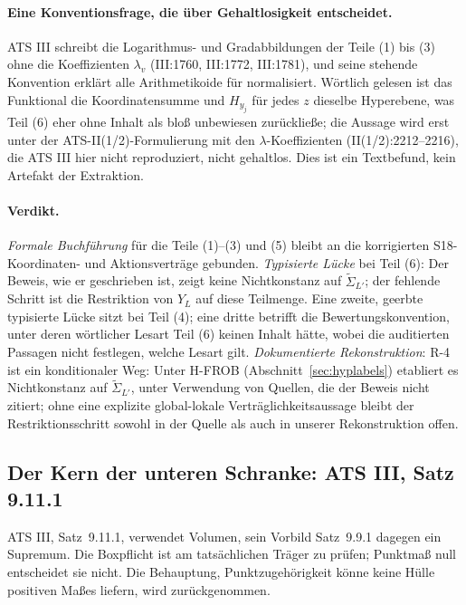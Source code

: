 \documentclass[11pt,a4paper]{article}
\theoremstyle{definition}
\theoremstyle{remark}
\begin{document}
\paragraph{Eine Konventionsfrage, die über Gehaltlosigkeit entscheidet.} ATS
III schreibt die Logarithmus- und Gradabbildungen der Teile (1) bis (3) ohne
die Koeffizienten $\lambda_v$ (III:1760, III:1772, III:1781), und seine
stehende Konvention erklärt alle Arithmetikoide für normalisiert. Wörtlich
gelesen ist das Funktional die Koordinatensumme und $H_{y_j}$ für jedes $z$
dieselbe Hyperebene, was Teil (6) eher ohne Inhalt als bloß unbewiesen
zurückließe; die Aussage wird erst unter der ATS-II(1/2)-Formulierung mit
den $\lambda$-Koeffizienten (II(1/2):2212--2216), die ATS III hier nicht
reproduziert, nicht gehaltlos. Dies ist ein Textbefund, kein Artefakt der
Extraktion.

\paragraph{Verdikt.} \emph{Formale Buchführung} für die Teile (1)--(3) und (5) bleibt
an die korrigierten S18-Koordinaten- und Aktionsverträge gebunden. \emph{Typisierte Lücke} bei Teil (6):
Der Beweis, wie er geschrieben ist, zeigt keine Nichtkonstanz auf
$\widetilde{\Sigma}_{L'}$; der fehlende Schritt ist die Restriktion von
$Y_L$ auf diese Teilmenge. Eine zweite, geerbte typisierte Lücke sitzt bei
Teil (4); eine dritte betrifft die Bewertungskonvention, unter deren
wörtlicher Lesart Teil (6) keinen Inhalt hätte, wobei die auditierten
Passagen nicht festlegen, welche Lesart gilt. \emph{Dokumentierte
Rekonstruktion}: R-4 ist ein konditionaler Weg: Unter H-FROB
(Abschnitt~\ref{sec:hyplabels}) etabliert es Nichtkonstanz auf
$\widetilde{\Sigma}_{L'}$, unter Verwendung von Quellen, die der Beweis
nicht zitiert; ohne eine explizite global-lokale
Verträglichkeitsaussage bleibt der Restriktionsschritt sowohl in der Quelle
als auch in unserer Rekonstruktion offen.

\subsection{Der Kern der unteren Schranke: ATS III, Satz 9.11.1}\label{sec:s8}

ATS III, Satz~9.11.1, verwendet Volumen, sein Vorbild Satz~9.9.1 dagegen
ein Supremum. Die Boxpflicht ist am tatsächlichen Träger zu prüfen;
Punktmaß null entscheidet sie nicht. Die Behauptung, Punktzugehörigkeit
könne keine Hülle positiven Maßes liefern, wird zurückgenommen.
\end{document}
